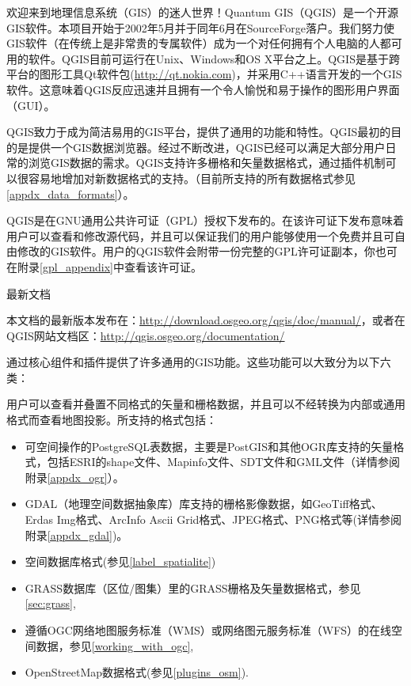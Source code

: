 \mainmatter
\pagestyle{scrheadings}
\label{label_forward}
\setcounter{page}{1}


欢迎来到地理信息系统（GIS）的迷人世界！Quantum GIS（QGIS）是一个开源GIS软件。本项目开始于2002年5月并于同年6月在SourceForge落户。我们努力使GIS软件（在传统上是非常贵的专属软件）成为一个对任何拥有个人电脑的人都可用的软件。QGIS目前可运行在Unix、Windows和OS X平台之上。QGIS是基于跨平台的图形工具Qt软件包(\url{http://qt.nokia.com})，并采用C++语言开发的一个GIS软件。这意味着QGIS反应迅速并且拥有一个令人愉悦和易于操作的图形用户界面（GUI）。

QGIS致力于成为简洁易用的GIS平台，提供了通用的功能和特性。QGIS最初的目的是提供一个GIS数据浏览器。经过不断改进，QGIS已经可以满足大部分用户日常的浏览GIS数据的需求。QGIS支持许多栅格和矢量数据格式，通过插件机制可以很容易地增加对新数据格式的支持。（目前所支持的所有数据格式参见\ref{appdx_data_formats}）。

QGIS是在GNU通用公共许可证（GPL）授权下发布的。在该许可证下发布意味着用户可以查看和修改源代码，并且可以保证我们的用户能够使用一个免费并且可自由修改的GIS软件。用户的QGIS软件会附带一份完整的GPL许可证副本，你也可在附录\ref{gpl_appendix}中查看该许可证。

\begin{Tip}\caption{\textsc{最新文档}}
本文档的最新版本发布在：\url{http://download.osgeo.org/qgis/doc/manual/}，或者在QGIS网站文档区：\url{http://qgis.osgeo.org/documentation/}
\end{Tip}

\label{label_majfeat}
\qg 通过核心组件和插件提供了许多通用的GIS功能。这些功能可以大致分为以下六类：


用户可以查看并叠置不同格式的矢量和栅格数据，并且可以不经转换为内部或通用格式而查看地图投影。所支持的格式包括：

\begin{itemize}[label=--]
\item 可空间操作的PostgreSQL表数据，主要是PostGIS和其他OGR库支持的矢量格式，包括ESRI的shape文件、Mapinfo文件、SDT文件和GML文件（详情参阅附录\ref{appdx_ogr}）。
\item GDAL（地理空间数据抽象库）库支持的栅格影像数据，如GeoTiff格式、Erdas Img格式、ArcInfo Ascii Grid格式、JPEG格式、PNG格式等(详情参阅附录\ref{appdx_gdal})。
\item 空间数据库格式(参见\ref{label_spatialite}) 
\item GRASS数据库（区位/图集）里的GRASS栅格及矢量数据格式，参见\ref{sec:grass}, 
\item 遵循OGC网络地图服务标准（WMS）或网络图元服务标准（WFS）的在线空间数据，参见\ref{working_with_ogc},
\item OpenStreetMap数据格式(参见\ref{plugins_osm}).
\end{itemize}

